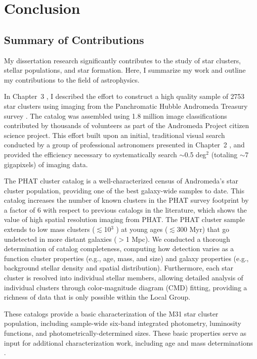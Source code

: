 \chapter{Conclusion}\label{ch7}

\section{Summary of Contributions}

My dissertation research significantly contributes to the study of star clusters, stellar populations, and star formation.  Here, I summarize my work and outline my contributions to the field of astrophysics.

In Chapter~3 \citep{Johnson15_AP}, I described the effort to construct a high quality sample of 2753 star clusters using imaging from the Panchromatic Hubble Andromeda Treasury survey \citep[PHAT;][]{Dalcanton12}.  The catalog was assembled using 1.8 million image classifications contributed by thousands of volunteers as part of the Andromeda Project citizen science project.  This effort built upon an initial, traditional visual search conducted by a group of professional astronomers presented in Chapter~2 \citep{Johnson12}, and provided the efficiency necessary to systematically search $\sim$0.5 deg$^2$ (totaling $\sim$7 gigapixels) of imaging data.

The PHAT cluster catalog is a well-characterized census of Andromeda's star cluster population, providing one of the best galaxy-wide samples to date.  This catalog increases the number of known clusters in the PHAT survey footprint by a factor of 6 with respect to previous catalogs in the literature, which shows the value of high spatial resolution imaging from PHAT.  The PHAT cluster sample extends to low mass clusters ($\lesssim$10$^3$ \solmass) at young ages ($\lesssim$300 Myr) that go undetected in more distant galaxies ($>$1 Mpc).  We conducted a thorough determination of catalog completeness, computing how detection varies as a function cluster properties (e.g., age, mass, and size) and galaxy properties (e.g., background stellar density and spatial distribution).  Furthermore, each star cluster is resolved into individual stellar members, allowing detailed analysis of individual clusters through color-magnitude diagram (CMD) fitting, providing a richness of data that is only possible within the Local Group.

These catalogs provide a basic characterization of the M31 star cluster population, including sample-wide six-band integrated photometry, luminosity functions, and photometrically-determined sizes.  These basic properties serve as input for additional characterization work, including age and mass determinations \citep[][L. Beerman et al., in preparation]{Fouesneau14}.

